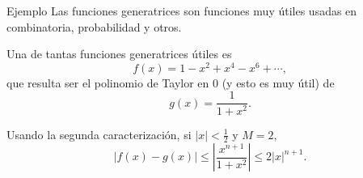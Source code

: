\begin{frame}{Ejemplo}
  Las funciones generatrices son funciones muy útiles usadas en
  combinatoria, probabilidad y otros.

  Una de tantas funciones generatrices útiles es
  \[
    f(x) = 1 - x^2 + x^4 - x^6 + \cdots,
  \]
  que resulta ser el polinomio de Taylor en $0$ (y esto es muy útil) de
  \[
    g(x) = \frac{1}{1 + x^2}.
  \]

  Usando la segunda caracterización, si $\lvert x \rvert < \frac{1}{2}$ y
  $M = 2$,
  \[
    \lvert f(x) - g(x) \rvert 
    \leq \left\lvert \frac{x^{n + 1}}{1 + x^2} \right\rvert
    \leq 2 \lvert x \rvert^{n + 1}.
  \]
\end{frame}
